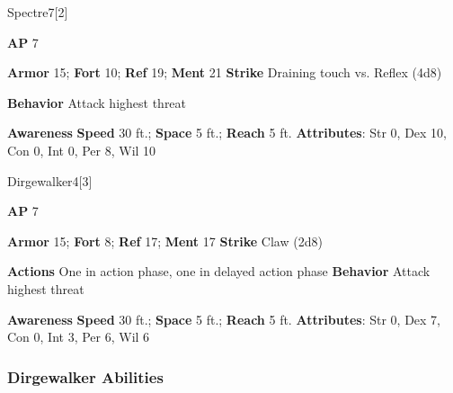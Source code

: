 \begin{monsection}{Spectre}{7}[2]
\vspace{-1em}\vspace{-1em}
\begin{spellcontent}
\begin{spelltargetinginfo}
{\textbf{AP} 7}

\pari \textbf{Armor} 15;
\textbf{Fort} 10;
\textbf{Ref} 19;
\textbf{Ment} 21
\pari \textbf{Strike} Draining touch  vs. Reflex (4d8)



\pari \textbf{Behavior} Attack highest threat
\end{spelltargetinginfo}
\end{spellcontent}

\begin{monsterfooter}
\pari \textbf{Awareness} 
\pari \textbf{Speed} 30 ft.;
\textbf{Space} 5 ft.;
\textbf{Reach} 5 ft.
\pari \textbf{Attributes}:
Str 0,
Dex 10,
Con 0,
Int 0,
Per 8,
Wil 10
\end{monsterfooter}
\end{monsection}

\begin{monsection}{Dirgewalker}{4}[3]
\vspace{-1em}\vspace{-1em}
\begin{spellcontent}
\begin{spelltargetinginfo}
{\textbf{AP} 7}

\pari \textbf{Armor} 15;
\textbf{Fort} 8;
\textbf{Ref} 17;
\textbf{Ment} 17
\pari \textbf{Strike} Claw  (2d8)


\pari \textbf{Actions} One in action phase, one in delayed action phase
\pari \textbf{Behavior} Attack highest threat
\end{spelltargetinginfo}
\end{spellcontent}

\begin{monsterfooter}
\pari \textbf{Awareness} 
\pari \textbf{Speed} 30 ft.;
\textbf{Space} 5 ft.;
\textbf{Reach} 5 ft.
\pari \textbf{Attributes}:
Str 0,
Dex 7,
Con 0,
Int 3,
Per 6,
Wil 6
\end{monsterfooter}
\end{monsection}


\subsubsection{Dirgewalker Abilities}

